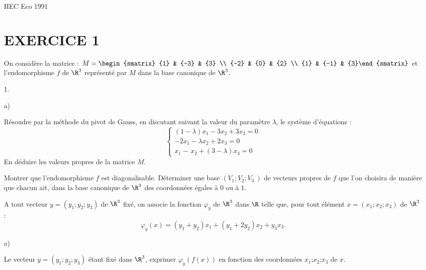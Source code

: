 \documentclass[11pt]{article}%
\begin{document}
\begin{center}
{\huge HEC Eco 1991}
\end{center}

\section*{EXERCICE 1}

On considère la matrice : $M = {{\begin{smatrix}
{1} & {-3} & {3} \\
{-2} & {0} & {2} \\
{1} & {-1} & {3}\end{smatrix}
}}$ et l'endomorphisme $f$ de $\R^{3}$ représenté par $M$ dans la
base canonique de $\R^{3}$.

\begin{noliste}{1.}
 \setlength{\itemsep}{4mm}
\item 

\begin{noliste}{a)}
 \setlength{\itemsep}{2mm}
\item Résoudre par la méthode du pivot de Gauss, en discutant suivant
la
valeur du paramètre $\lambda $, le système d'équations : 
\[
\left\{ 
\begin{array}{c}
\left( {1-\lambda }\right) x_{1}-3x_{2} + 3x_{3} = 0 \\
{-2x_{1}-\lambda x_{2} + 2x_{3} = 0} \\
{x_{1}-\,x_{2} + \left( {3-\lambda }\right) x_{3} = 0}
\end{array}
\right. 
\]
En déduire les valeurs propres de la matrice $M.$

\item Montrer que l'endomorphisme $f$ est diagonalisable. Déterminer
une
base $(V_{1};V_{2};V_{3}\ )$ de vecteurs propres de $f$ que l'on
choisira de
manière que chacun ait, dans la base canonique de $\R^{3}$ des
coordonnées égales à $0$ ou à $1$.
\end{noliste}

\item A tout vecteur $y = (y_{1};y_{2};y_{3})$ de $\R^{3}$ fixé, on
associe la fonction $\varphi_{y}$ de $\R^{3}$ dans $\R$
telle que, pour tout élément $x = (x_{1};x_{2};x_{3})$ de $\R^{3}$ :
\[
\varphi_{y}(x) = (y_{1} + y_{2})x_{1} + (y_{1} + 2y_{2})x_{2} +
y_{3}x_{3}.
\]

\begin{noliste}{a)}
 \setlength{\itemsep}{2mm}
\item Le vecteur $y = (y_{1};y_{2};y_{3})$ étant fixé dans $\R^{3}$,
exprimer $\varphi_{y}(f(x))$ en fonction des coordonnées
$x_{1}$;$x_{2}$;$x_{3}$ de $x$.


\end{noliste}
\end{noliste}
\end{document}
